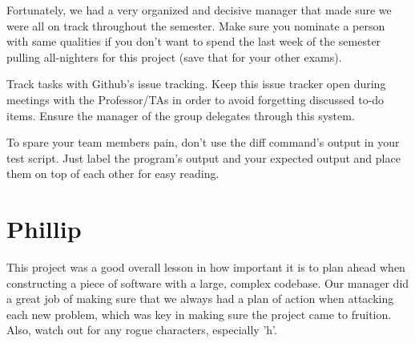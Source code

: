 \begin{homeworkProblem}
	Fortunately, we had a very organized and decisive manager that made sure we were all on track throughout the semester. Make sure you nominate a person with same qualities if you don't want to spend the last week of the semester pulling all-nighters for this project (save that for your other exams).
	
	Track tasks with Github's issue tracking. Keep this issue tracker open during meetings with the Professor/TAs in order to avoid forgetting discussed to-do items. Ensure the manager of the group delegates through this system.
	
	To spare your team members pain, don't use the diff command's output in your test script. Just label the program's output and your expected output and place them on top of each other for easy reading. 
	\section{Phillip}
	This project was a good overall lesson in how important it is to plan ahead when constructing a piece of software with a large, complex codebase. Our manager did a great job of making sure that we always had a plan of action when attacking each new problem, which was key in making sure the project came to fruition. Also, watch out for any rogue characters, especially 'h'.
\end{homeworkProblem}